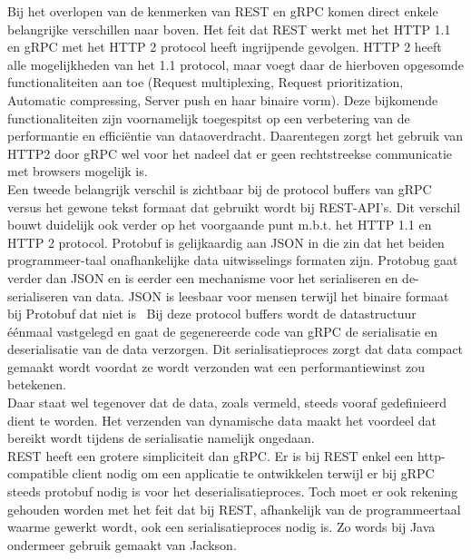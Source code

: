 Bij het overlopen van de kenmerken van REST en gRPC komen direct enkele belangrijke verschillen naar boven.
Het feit dat REST werkt met het HTTP 1.1 en gRPC met het HTTP 2 protocol heeft ingrijpende gevolgen. HTTP 2 heeft alle mogelijkheden van het 1.1 protocol,
maar voegt daar de hierboven opgesomde functionaliteiten aan toe (Request multiplexing, Request prioritization, Automatic compressing,
Server push en haar binaire vorm). Deze bijkomende functionaliteiten zijn voornamelijk toegespitst op een verbetering van de performantie en efficiëntie van dataoverdracht.
Daarentegen zorgt het gebruik van HTTP2 door gRPC wel voor het nadeel dat er geen rechtstreekse communicatie met browsers mogelijk is.
~\autocite{cloudflare}
~\autocite{tutsplus}\\

Een tweede belangrijk verschil is zichtbaar bij de protocol buffers van gRPC versus het gewone tekst formaat dat gebruikt wordt bij REST-API's.
Dit verschil bouwt duidelijk ook verder op het voorgaande punt m.b.t. het HTTP 1.1 en HTTP 2 protocol.
Protobuf is gelijkaardig aan JSON in die zin dat het beiden programmeer-taal onafhankelijke data uitwisselings formaten zijn.
Protobug gaat verder dan JSON en is eerder een mechanisme voor het serialiseren en de-serialiseren van data.
JSON is leesbaar voor mensen terwijl het binaire formaat bij Protobuf dat niet is~\parencite{json}
Bij deze protocol buffers wordt de datastructuur éénmaal vastgelegd en gaat de gegenereerde code van gRPC de serialisatie en deserialisatie van de data verzorgen.
Dit serialisatieproces zorgt dat data compact gemaakt wordt voordat ze wordt verzonden wat een performantiewinst zou betekenen. ~\autocite{googleprotobufguide}\\

Daar staat wel tegenover dat de data, zoals vermeld, steeds vooraf gedefinieerd dient te worden.
Het verzenden van dynamische data maakt het voordeel dat bereikt wordt tijdens de serialisatie namelijk ongedaan.\\

REST heeft een grotere simpliciteit dan gRPC. Er is bij REST enkel een http-compatible client nodig om een applicatie te ontwikkelen terwijl
er bij gRPC steeds protobuf nodig is voor het deserialisatieproces. Toch moet er ook rekening gehouden worden met het feit dat bij REST,
afhankelijk van de programmeertaal waarme gewerkt wordt, ook een serialisatieproces nodig is. Zo words bij Java ondermeer gebruik gemaakt van Jackson.\\
~\autocite{jackson}

